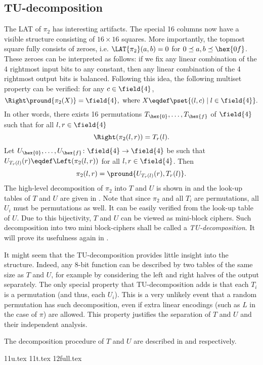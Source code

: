 
\subsection{TU-decomposition}

The LAT of $\pi_2$ has interesting artifacts. The special 16 columns now have a visible structure consisting of $16\times16$ squares. More importantly, the topmost square fully consists of zeroes, i.e. $\LAT{\pi_2}(a,b)=0$ for $0 \preceq a,b \preceq \hex{0f}$. These zeroes can be interpreted as follows: if we fix any linear combination of the 4 rightmost input bits to any constant, then any linear combination of the 4 rightmost output bits is balanced. Following this idea, the following multiset property can be verified: for any $c \in \field{4}$, 
$$
\Right \pround{\pi_2(X)} = \field{4}, ~\text{where}~X \eqdef \pset{(l, c) \mid l \in \field{4}}.
$$
In other words, there exists 16 permutations $T_{\hex{0}},\ldots, T_{\hex{f}}$ of $\field{4}$ such that for all $l,r \in \field{4}$
$$\Right(\pi_2(l, r)) = T_{r}(l).$$ 
Let $U_{\hex{0}},\ldots,U_{\hex{f}}\colon \field{4} \to \field{4}$ be such that $U_{T_r(l)}(r) \eqdef \Left(\pi_2(l,r))$ for all $l,r \in \field{4}$. Then
$$
\pi_2(l,r) = \pround{U_{T_r(l)}(r), T_r(l)}.
$$
The high-level decomposition of $\pi_2$ into $T$ and $U$ is shown in  and the look-up tables of $T$ and $U$ are given in . Note that since $\pi_2$ and all $T_i$ are permutations, all $U_i$ must be permutations as well. It can be easily verified from the look-up table of $U$. Due to this bijectivity, $T$ and $U$ can be viewed as mini-block ciphers. Such decomposition into two mini block-ciphers shall be called a \emph{TU-decomposition}. It will prove its usefulness again in .



\begin{remark}
It might seem that the TU-decomposition provides little insight into the structure. Indeed, any 8-bit function can be described by two tables of the same size as $T$ and $U$, for example by considering the left and right halves of the output separately. The only special property that TU-decomposition adds is that each $T_i$ is a permutation (and thus, each $U_i$). This is a very unlikely event that a random permutation has such decomposition, even if extra linear encodings (such as $L$ in the case of $\pi$) are allowed. This property justifies the separation of $T$ and $U$ and their independent analysis.
\end{remark}

The decomposition procedure of $T$ and $U$ are described in  and  respectively.

{11u.tex}
{11t.tex}
{12full.tex}